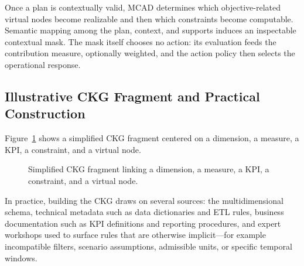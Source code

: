 \documentclass[journal]{IEEEtran}
\begin{document}
Once a plan is contextually valid, MCAD determines which objective-related virtual nodes become realizable and then which constraints become computable. Semantic mapping among the plan, context, and supports induces an inspectable contextual mask. The mask itself chooses no action: its evaluation feeds the contribution measure, optionally weighted, and the action policy then selects the operational response.

\subsection{Illustrative CKG Fragment and Practical Construction}

Figure~\ref{fig:ckg-fragment} shows a simplified CKG fragment centered on a dimension, a measure, a KPI, a constraint, and a virtual node.

\begin{figure}[!t]
\centering
{}
\caption{Simplified CKG fragment linking a dimension, a measure, a KPI, a constraint, and a virtual node.}
\label{fig:ckg-fragment}
\end{figure}

In practice, building the CKG draws on several sources: the multidimensional schema, technical metadata such as data dictionaries and ETL rules, business documentation such as KPI definitions and reporting procedures, and expert workshops used to surface rules that are otherwise implicit---for example incompatible filters, scenario assumptions, admissible units, or specific temporal windows.
\end{document}
